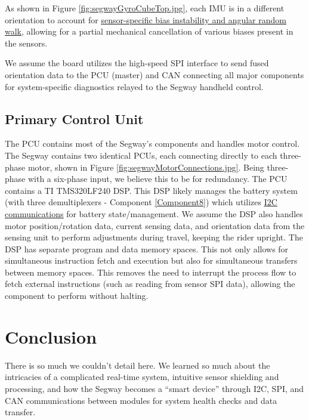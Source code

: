 \documentclass[]{formalLabReport}
\begin{document}
As shown in Figure \underline{\ref{fig:segwayGyroCubeTop.jpg}}, each IMU is in a different orientation to account for \href{https://base.xsens.com/hc/en-us/articles/209611089-Understanding-Sensor-Bias-offset-}{\underline{sensor-specific} \underline{bias instability and angular random walk}}, allowing for a partial mechanical cancellation of various biases present in the sensors. 

We assume the board utilizes the high-speed SPI interface to send fused orientation data to the PCU (master) and CAN connecting all major components for system-specific diagnostics relayed to the Segway handheld control.

\subsection{Primary Control Unit}
The PCU contains most of the Segway’s components and handles motor control. The Segway contains two identical PCUs, each connecting directly to each three-phase motor, shown in Figure \underline{\ref{fig:segwayMotorConnections.jpg}}. Being three-phase with a six-phase input, we believe this to be for redundancy. The PCU contains a TI TMS320LF240 DSP. This DSP likely manages the battery system (with three demultiplexers - Component \underline{\ref{Component8}}) which utilizes \href{https://github.com/martinbogo/pt-battery-diagnostics}{\underline{I2C} \underline{communications}} for battery \newline state/management. We assume the DSP also handles motor position/rotation data, current sensing data, and orientation data from the sensing unit to perform adjustments during travel, keeping the rider upright. The DSP has separate program and data memory spaces. This not only allows for simultaneous instruction fetch and execution but also for simultaneous transfers between memory spaces. This removes the need to interrupt the process flow to fetch external instructions (such as reading from sensor SPI data), allowing the component to perform without halting.

\section{Conclusion}
There is so much we couldn’t detail here. We learned so much about the intricacies of a complicated real-time system, intuitive sensor shielding and processing, and how the Segway becomes a “smart device” through I2C, SPI, and CAN communications between modules for system health checks and data transfer.
\end{document}
